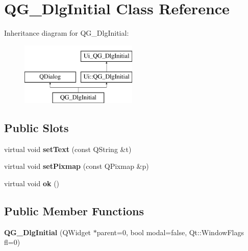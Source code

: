 \hypertarget{classQG__DlgInitial}{\section{Q\-G\-\_\-\-Dlg\-Initial Class Reference}
\label{classQG__DlgInitial}
}
Inheritance diagram for Q\-G\-\_\-\-Dlg\-Initial\-:\begin{figure}[H]
\begin{center}
\leavevmode
\includegraphics[height=3.000000cm]{classQG__DlgInitial}
\end{center}
\end{figure}
\subsection*{Public Slots}
\begin{DoxyCompactItemize}
\item 
\hypertarget{classQG__DlgInitial_ad64f73686980468c477e078abf7b84fe}{virtual void {\bfseries set\-Text} (const Q\-String \&t)}\label{classQG__DlgInitial_ad64f73686980468c477e078abf7b84fe}

\item 
\hypertarget{classQG__DlgInitial_a398f2f2dbb51a6b152a515796c2e21dd}{virtual void {\bfseries set\-Pixmap} (const Q\-Pixmap \&p)}\label{classQG__DlgInitial_a398f2f2dbb51a6b152a515796c2e21dd}

\item 
\hypertarget{classQG__DlgInitial_a5e894426d55c1ec3d34edd163fe2bd13}{virtual void {\bfseries ok} ()}\label{classQG__DlgInitial_a5e894426d55c1ec3d34edd163fe2bd13}

\end{DoxyCompactItemize}
\subsection*{Public Member Functions}
\begin{DoxyCompactItemize}
\item 
\hypertarget{classQG__DlgInitial_a18852b3cb171cf9c380b65fdb6b386ab}{{\bfseries Q\-G\-\_\-\-Dlg\-Initial} (Q\-Widget $\ast$parent=0, bool modal=false, Qt\-::\-Window\-Flags fl=0)}\label{classQG__DlgInitial_a18852b3cb171cf9c380b65fdb6b386ab}

\end{DoxyCompactItemize}
